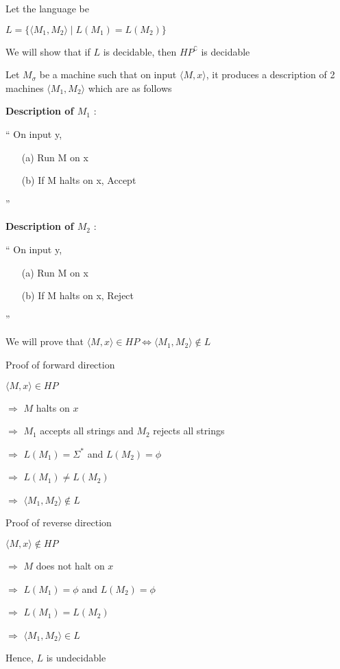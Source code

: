 \newcommand{\la}{\langle}
\newcommand{\ra}{\rangle}
\newcommand{\imp}{$\Rightarrow$}
Let the language be 

$L = \{\langle M_1, M_2 \rangle \mid L(M_1) = L(M_2)\}$

We will show that if $L$ is decidable, then $HP^\complement$ is decidable

Let $M_\sigma$ be a machine such that on input $\langle M, x \rangle$, it produces a description of 2 machines $\la M_1, M_2 \ra$ which are as follows

\textbf{Description of $M_1$} :

``
On input y,
\begin{enumerate}
    \item[(a)] Run M on x
    \item[(b)] If M halts on x, Accept
\end{enumerate}
''

\textbf{Description of $M_2$} :

``
On input y,
\begin{enumerate}
    \item[(a)] Run M on x
    \item[(b)] If M halts on x, Reject
\end{enumerate}
''

We will prove that $\la M, x \ra \in HP \Leftrightarrow \la M_1, M_2 \ra \notin L$

Proof of forward direction

$\la M, x \ra \in HP$

\imp
$M$ halts on $x$

\imp
$M_1$ accepts all strings and $M_2$ rejects all strings

\imp
$L(M_1) = \Sigma ^ *$ and $L(M_2) = \phi$

\imp
$L(M_1) \neq L(M_2)$

\imp
$\la M_1, M_2 \ra \notin L$

Proof of reverse direction

$\la M, x \ra \notin HP$

\imp
$M$ does not halt on $x$

\imp
$L(M_1) = \phi$ and $L(M_2) = \phi$

\imp
$L(M_1) = L(M_2)$

\imp
$\la M_1, M_2 \ra \in L$


Hence, $L$ is undecidable











